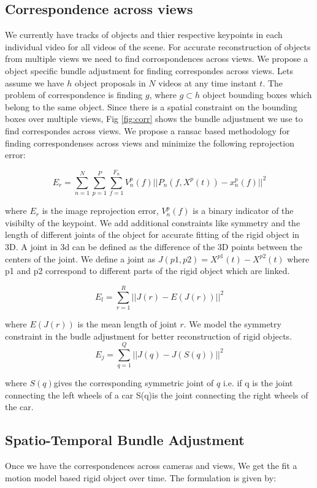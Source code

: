 \documentclass[10pt,twocolumn,letterpaper]{article}
\begin{document}
\subsection{Correspondence across views}
We currently have tracks of objects and thier respective keypoints in each individual video for all videos of the scene. For accurate reconstruction of objects from multiple views we need to find corrospondences across views. We propose a object specific bundle adjustment for finding correspondes across views. Lets assume we have $h$ object proposals in $N$ videos at any time instant $t$. The problem of correspondence is finding $g$, where $g \subset h$ object bounding boxes which belong to the same object. Since there is a spatial constraint on the bounding boxes over multiple views, Fig \ref{fig:corr} shows the bundle adjustment we use to find correspondes across views. We propose a ransac based methodology for finding correspondenses across views and minimize the following reprojection error:

\begin{equation}
  	E_r =\sum_{n=1}^{N} \sum_{p=1}^P \sum_{f=1}^{F_n} V_n^p(f) ||P_n(f,X^p(t)) - x_n^p(f)||^2
\end{equation}
   
where $E_r$ is the image reprojection error, $V_n^p(f)$ is a binary indicator of the visibilty of the keypoint. We add additional constraints like symmetry and the length of different joints of the object for accurate fitting of the rigid object in 3D. A joint in 3d can be defined as the difference of the 3D points between the centers of the joint. We define a joint as $J(p1,p2) = X^{p1}(t) - X^{p2}(t) $ where p1 and p2 correspond to different parts of the rigid object which are linked. 

\begin{equation}
  	E_l = \sum_{r=1}^R ||J(r) - E(J(r))||^2  
\end{equation}

where $E(J(r))$ is the mean length of joint $r$. We model the symmetry constraint in the budle adjustment for better reconstruction of rigid objects.
\begin{equation}
  	E_j = \sum_{q = 1}^Q ||J(q) - J(S(q))||^2
\end{equation}

where $S(q)$gives the corresponding symmetric joint of $q$ i.e. if q is the joint connecting the left wheels of a car S(q)is the joint connecting the right wheels of the car.

\subsection{Spatio-Temporal Bundle Adjustment}
Once we have the correspondences across cameras and views, We get the fit a motion model based rigid object over time. The formulation is given by:
\end{document}
